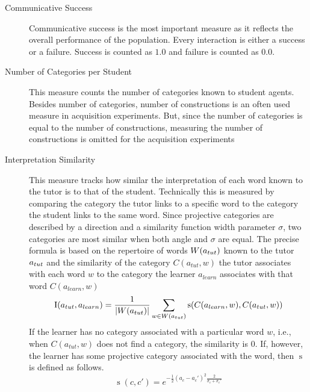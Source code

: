 \begin{description}
\item[Communicative Success] Communicative success is the most important
measure as it reflects the overall performance of the population. Every interaction
is either a success or a failure. Success is counted as $1.0$ and failure 
is counted as $0.0$. 
\item[Number of Categories per Student] This measure counts 
the number of categories known to student agents. 
Besides number of categories, number of constructions is an often
used measure in acquisition experiments.
But, since the number of categories is equal to the number of constructions, 
measuring the number of constructions is omitted for the acquisition experiments
\item[Interpretation Similarity] This measure tracks how similar the 
interpretation of each word known to the tutor is to that of the student. 
Technically this is measured by comparing the category the tutor links
to a specific word to the category the student links to the same word.
Since projective categories are described by a direction and a similarity function 
width parameter $\sigma$, two categories are most similar when both angle 
and $\sigma$ are equal. The precise formula is based on the repertoire of 
words $W(a_\mathnormal{tut})$ known to the tutor 
$a_\mathnormal{tut}$ and the similarity of the category $C(a_{tut},w)$ the tutor 
associates with each word $w$ to the category the learner $a_{learn}$
associates with that word $C(a_{learn},w)$
\begin{equation*}
\operatorname{I}(a_{tut},a_{learn}) 
= 
\frac{1}{|W(a_{tut})|}\sum_{w \in W(a_\mathnormal{tut})} 
\operatorname{s}(C(a_{learn},w),C(a_{tut},w))
\end{equation*}
If the learner has no category associated with a particular word $w$, i.e., when $C(a_{tut},w)$ 
does not find a category, the similarity is $0$. If, however, the learner has some projective category
associated with the word, then $\operatorname{s}$ is defined as follows.
\begin{equation*}
\operatorname{s}(c,c')=e^{-\frac{1}{2}(a_c - a_c')^2\frac{2}{\sigma_c + \sigma_c'}}
\end{equation*}
\end{description}

